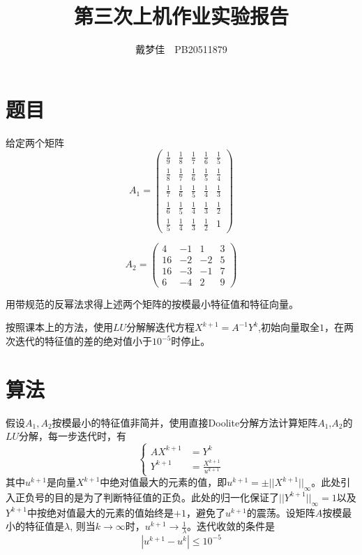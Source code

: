 \documentclass[english]{ctexart}
\begin{document}
\title{第三次上机作业实验报告}
\author{戴梦佳\ \ PB20511879}
\maketitle

\section{题目}

给定两个矩阵
\[
A_{1}=\begin{pmatrix}\frac{1}{9} & \frac{1}{8} & \frac{1}{7} & \frac{1}{6} & \frac{1}{5}\\
\frac{1}{8} & \frac{1}{7} & \frac{1}{6} & \frac{1}{5} & \frac{1}{4}\\
\frac{1}{7} & \frac{1}{6} & \frac{1}{5} & \frac{1}{4} & \frac{1}{3}\\
\frac{1}{6} & \frac{1}{5} & \frac{1}{4} & \frac{1}{3} & \frac{1}{2}\\
\frac{1}{5} & \frac{1}{4} & \frac{1}{3} & \frac{1}{2} & 1
\end{pmatrix}
\]

\[
A_{2}=\begin{pmatrix}4 & -1 & 1 & 3\\
16 & -2 & -2 & 5\\
16 & -3 & -1 & 7\\
6 & -4 & 2 & 9
\end{pmatrix}
\]

用带规范的反幂法求得上述两个矩阵的按模最小特征值和特征向量。

按照课本上的方法，使用$LU$分解解迭代方程$X^{k+1}=A^{-1}Y^{k}$,初始向量取全$1$，在两次迭代的特征值的差的绝对值小于$10^{-5}$时停止。

\section{算法}

假设$A_{1},A_{2}$按模最小的特征值非简并，使用直接Doolite分解方法计算矩阵$A_{1}$,$A_{2}$的$LU$分解，每一步迭代时，有
\begin{equation}
\begin{cases}
AX^{k+1} & =Y^{k}\\
Y^{k+1} & =\frac{X^{k+1}}{u^{k+1}}
\end{cases}
\end{equation}
其中$u^{k+1}$是向量$X^{k+1}$中绝对值最大的元素的值，即$u^{k+1}=\pm||X^{k+1}||_{\infty}$。此处引入正负号的目的是为了判断特征值的正负。此处的归一化保证了$||Y^{k+1}||_{\infty}=1$以及$Y^{k+1}$中按绝对值最大的元素的值始终是$+1$，避免了$u^{k+1}$的震荡。设矩阵$A$按模最小的特征值是$\lambda$,
则当$k\to\infty$时，$u^{k+1}\to\frac{1}{\lambda}$。迭代收敛的条件是
\begin{equation}
|u^{k+1}-u^{k}|\leq10^{-5}
\end{equation}
\end{document}
